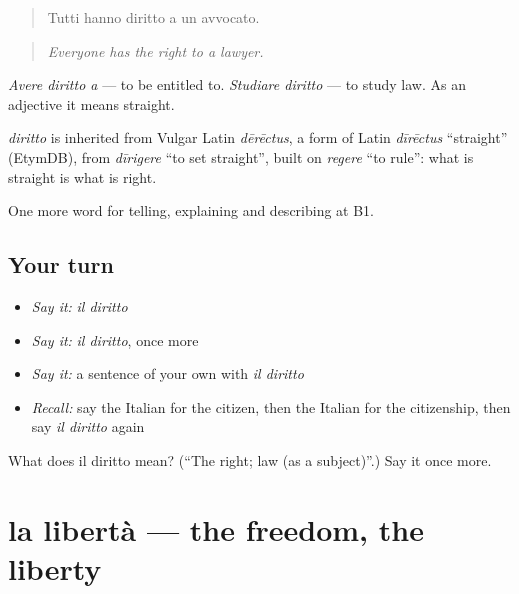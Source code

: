 \begin{quote}
Tutti hanno diritto a un avvocato.
\end{quote}

\begin{quote}
\emph{Everyone has the right to a lawyer.}
\end{quote}

\emph{Avere diritto a} — to be entitled to. \emph{Studiare diritto} — to study law. As an adjective it means straight.

\begin{cousinweb}
\emph{diritto} is inherited from Vulgar Latin \emph{dērēctus}, a form of Latin \emph{dīrēctus} \textquotedblleft{}straight\textquotedblright{} (EtymDB), from \emph{dīrigere} \textquotedblleft{}to set straight\textquotedblright{}, built on \emph{regere} \textquotedblleft{}to rule\textquotedblright{}: what is straight is what is right.
\end{cousinweb}

\begin{grammarlens}[title={What you've built}]
One more word for telling, explaining and describing at B1.
\end{grammarlens}

\subsection*{Your turn}
\begin{itemize}
\raggedright
  \item \emph{Say it:} \emph{il diritto}
  \item \emph{Say it:} \emph{il diritto}, once more
  \item \emph{Say it:} a sentence of your own with \emph{il diritto}
  \item \emph{Recall:} say the Italian for the citizen, then the Italian for the citizenship, then say \emph{il diritto} again
\end{itemize}

\begin{tcolorbox}[breakable,colback=teal!4,colframe=teal!35!black,title={Before you move on}]
What does il diritto mean? (\textquotedblleft{}The right; law (as a subject)\textquotedblright{}.) Say it once more.
\end{tcolorbox}
\section[la libertà]{la libertà — the freedom, the liberty}

